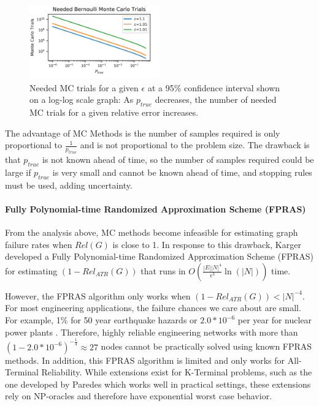 \begin{figure}[t]
\caption{Needed MC trials for a given $\epsilon$ at a 95\% confidence interval shown on a log-log scale graph: As $p_{true}$ decreases, the number of needed MC trials for a given relative error increases.}
\label{fig:MC Trial Graph}
\includegraphics[width=0.5\textwidth]{../figures/MCTrials.png}
\end{figure}

The advantage of MC Methods is the number of samples required is only proportional to \(\frac{1}{p_{true}}\) and is not proportional to the problem size. The drawback is that \(p_{true}\) is not known ahead of time, so the number of samples required could be large if \(p_{true}\) is very small and cannot be known ahead of time, and stopping rules must be used, adding uncertainty.

\hypertarget{fully-polynomial-time-randomized-approximation-scheme-fpras}{%
\paragraph{\texorpdfstring{Fully Polynomial-time Randomized Approximation Scheme (FPRAS)\\
}{Fully Polynomial-time Randomized Approximation Scheme (FPRAS) }}\label{fully-polynomial-time-randomized-approximation-scheme-fpras}}

From the analysis above, MC methods become infeasible for estimating graph failure rates when \(Rel(G)\) is close to 1. In response to this drawback, Karger \cite{karger2001randomized} developed a Fully Polynomial-time Randomized Approximation Scheme (FPRAS) for estimating \((1-Rel_{ATR}(G))\) that runs in \(O(\frac{|E||N|^4}{\epsilon^3}\ln(|N|))\) time.

However, the FPRAS algorithm only works when \((1-Rel_{ATR}(G))<|N|^{-4}\). For most engineering applications, the failure chances we care about are small. For example, 1\% for 50 year earthquake hazards \cite{IBC_2017} or \(2.0*10^{-6}\) per year for nuclear power plants \cite{NRC_2010}. Therefore, highly reliable engineering networks with more than \((1-2.0*10^{-6})^{-\frac{1}{4}} \approx 27\) nodes cannot be practically solved using known FPRAS methods. In addition, this FPRAS algorithm is limited and only works for All-Terminal Reliability. While extensions exist for K-Terminal problems, such as the one developed by Paredes \cite{paredes2019principled} which works well in practical settings, these extensions rely on NP-oracles and therefore have exponential worst case behavior.

